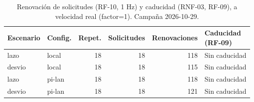 \begin{table}[H]
\centering
\caption{Renovación de solicitudes (RF-10, 1 Hz) y caducidad (RNF-03, RF-09), a velocidad real (factor=1). Campaña 2026-10-29.}
\label{tab:renovacion_campana}
\small
\begin{tabular}{llrrrl}
\toprule
\textbf{Escenario} & \textbf{Config.} & \textbf{Repet.} & \textbf{Solicitudes} & \textbf{Renovaciones} & \textbf{Caducidad (RF-09)} \\
\midrule
lazo & local & 18 & 18 & 118 & Sin caducidad \\
desvio & local & 18 & 18 & 115 & Sin caducidad \\
lazo & pi-lan & 18 & 18 & 118 & Sin caducidad \\
desvio & pi-lan & 18 & 18 & 121 & Sin caducidad \\
\bottomrule
\end{tabular}
\end{table}
